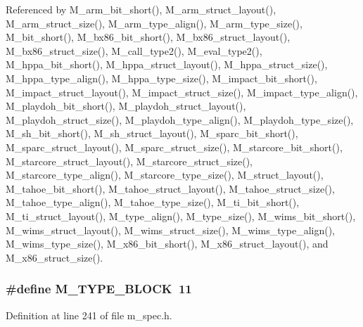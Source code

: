Referenced by M\_\-arm\_\-bit\_\-short(), M\_\-arm\_\-struct\_\-layout(), M\_\-arm\_\-struct\_\-size(), M\_\-arm\_\-type\_\-align(), M\_\-arm\_\-type\_\-size(), M\_\-bit\_\-short(), M\_\-bx86\_\-bit\_\-short(), M\_\-bx86\_\-struct\_\-layout(), M\_\-bx86\_\-struct\_\-size(), M\_\-call\_\-type2(), M\_\-eval\_\-type2(), M\_\-hppa\_\-bit\_\-short(), M\_\-hppa\_\-struct\_\-layout(), M\_\-hppa\_\-struct\_\-size(), M\_\-hppa\_\-type\_\-align(), M\_\-hppa\_\-type\_\-size(), M\_\-impact\_\-bit\_\-short(), M\_\-impact\_\-struct\_\-layout(), M\_\-impact\_\-struct\_\-size(), M\_\-impact\_\-type\_\-align(), M\_\-playdoh\_\-bit\_\-short(), M\_\-playdoh\_\-struct\_\-layout(), M\_\-playdoh\_\-struct\_\-size(), M\_\-playdoh\_\-type\_\-align(), M\_\-playdoh\_\-type\_\-size(), M\_\-sh\_\-bit\_\-short(), M\_\-sh\_\-struct\_\-layout(), M\_\-sparc\_\-bit\_\-short(), M\_\-sparc\_\-struct\_\-layout(), M\_\-sparc\_\-struct\_\-size(), M\_\-starcore\_\-bit\_\-short(), M\_\-starcore\_\-struct\_\-layout(), M\_\-starcore\_\-struct\_\-size(), M\_\-starcore\_\-type\_\-align(), M\_\-starcore\_\-type\_\-size(), M\_\-struct\_\-layout(), M\_\-tahoe\_\-bit\_\-short(), M\_\-tahoe\_\-struct\_\-layout(), M\_\-tahoe\_\-struct\_\-size(), M\_\-tahoe\_\-type\_\-align(), M\_\-tahoe\_\-type\_\-size(), M\_\-ti\_\-bit\_\-short(), M\_\-ti\_\-struct\_\-layout(), M\_\-type\_\-align(), M\_\-type\_\-size(), M\_\-wims\_\-bit\_\-short(), M\_\-wims\_\-struct\_\-layout(), M\_\-wims\_\-struct\_\-size(), M\_\-wims\_\-type\_\-align(), M\_\-wims\_\-type\_\-size(), M\_\-x86\_\-bit\_\-short(), M\_\-x86\_\-struct\_\-layout(), and M\_\-x86\_\-struct\_\-size().
\subsubsection{\setlength{\rightskip}{0pt plus 5cm}\#define M\_\-TYPE\_\-BLOCK~11}\label{m__spec_8h_d5def2d869f3f98144cda7d47a6c540d}




Definition at line 241 of file m\_\-spec.h.


